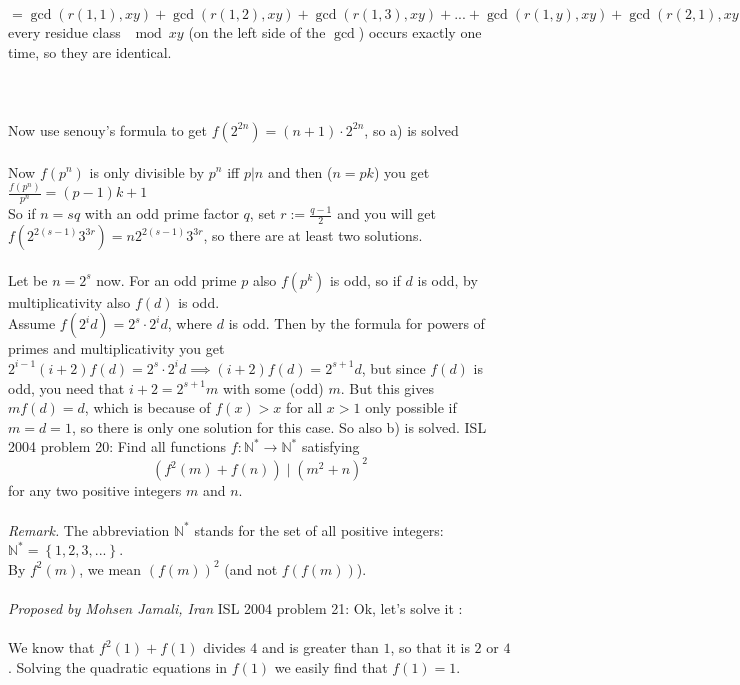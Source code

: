 $= \gcd(r(1,1),xy) + \gcd(r(1,2),xy) + \gcd(r(1,3),xy) + ... + \gcd(r(1,y),xy) + \gcd(r(2,1),xy) + ... + \gcd(r(x,y),xy)$ \\
every residue class $\mod xy$ (on the left side of the $\gcd$) occurs exactly one time, so they are identical. \\\\\\\\
Now use senouy's formula to get $f(2^{2n})=(n+1)\cdot 2^{2n}$, so a) is solved \\\\
Now $f(p^n)$ is only divisible by $p^n$ iff $p|n$ and then ($n=pk$) you get $\frac{f(p^n)}{p^n}=(p-1)k+1$ \\
So if $n=sq$ with an odd prime factor $q$, set $r:=\frac{q-1}{2}$ and you will get $f(2^{2(s-1)}3^{3r})=n 2^{2(s-1)}3^{3r}$, so there are at least two solutions. \\\\
Let be $n=2^s$ now. For an odd prime $p$ also $f(p^k)$ is odd, so if $d$ is odd, by multiplicativity also $f(d)$ is odd. \\
Assume $f(2^id)=2^s \cdot 2^i d$, where $d$ is odd. Then by the formula for powers of primes and multiplicativity you get $2^{i-1}(i+2) f(d) = 2^s \cdot 2^i d \implies (i+2) f(d) = 2^{s+1} d$, but since $f(d)$ is odd, you need that $i+2 = 2^{s+1} m$ with some (odd) $m$. But this gives $m f(d) =d$, which is because of $f(x)>x$ for all $x>1$ only possible if $m=d=1$, so there is only one solution for this case. So also b) is solved. 
ISL 2004 problem 20:  Find all functions $ f: \mathbb{N^*}\to \mathbb{N^*}$ satisfying
\[ \left(f^2\left(m\right)+f\left(n\right)\right) \mid \left(m^2+n\right)^2 \]
for any two positive integers $ m$ and $ n$. \\\\
\textit{Remark.} The abbreviation $ \mathbb{N^*}$ stands for the set of all positive integers: \\
$ \mathbb{N^*}=\left\{1,2,3,...\right\}$. \\
By $ f^2\left(m\right)$, we mean $ \left(f\left(m\right)\right)^2$ (and not $ f\left(f\left(m\right)\right)$). \\\\
\textit{Proposed by Mohsen Jamali, Iran} 
ISL 2004 problem 21:  Ok, let's solve it : \\\\
We know that $f^2(1)+f(1)$ divides $4$ and is greater than $1$, so that it is $2$ or $4$. Solving the quadratic equations in $f(1)$ we easily find that $f(1)=1.$ \\
